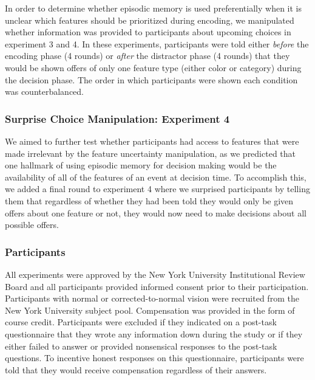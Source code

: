 \documentclass[10pt,letterpaper]{article}
\begin{document}
In order to determine whether episodic memory is used preferentially when it is unclear which features should be prioritized during encoding, we manipulated whether information was provided to participants about upcoming choices in experiment 3 and 4. In these experiments, participants were told either \textit{before} the encoding phase (4 rounds) or \textit{after} the distractor phase (4 rounds) that they would be shown offers of only one feature type (either color or category) during the decision phase. The order in which participants were shown each condition was counterbalanced.

\subsubsection{Surprise Choice Manipulation: Experiment 4}

We aimed to further test whether participants had access to features that were made irrelevant by the feature uncertainty manipulation, as we predicted that one hallmark of using episodic memory for decision making would be the availability of all of the features of an event at decision time. To accomplish this, we added a final round to experiment 4 where we surprised participants by telling them that regardless of whether they had been told they would only be given offers about one feature or not, they would now need to make decisions about all possible offers.

\subsubsection{Participants}

All experiments were approved by the New York University Institutional Review Board and all participants provided informed consent prior to their participation. Participants with normal or corrected-to-normal vision were recruited from the New York University subject pool. Compensation was provided in the form of course credit. Participants were excluded if they indicated on a post-task questionnaire that they wrote any information down during the study or if they either failed to answer or provided nonsensical responses to the post-task questions. To incentive honest responses on this questionnaire, participants were told that they would receive compensation regardless of their answers.
\end{document}
